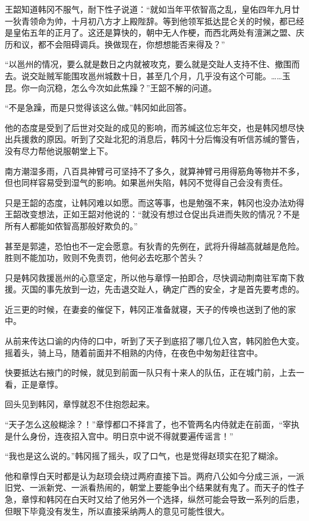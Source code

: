 王韶知道韩冈不服气，耐下性子说道：“就如当年平侬智高之乱，皇佑四年九月廿一狄青领命为帅，十月初八方才上殿陛辞。等到他领军抵达昆仑关的时候，都已经是皇佑五年的正月了。这还是算快的，朝中无人作梗，而西北两处有澶渊之盟、庆历和议，都不会阻碍调兵。换做现在，你想想能否来得及？”

“以邕州的情况，要么就是数日之内就被攻克，要么就是交趾人支持不住、撤围而去。说交趾贼军能围攻邕州城数十日，甚至几个月，几乎没有这个可能。……玉昆。你一向沉稳，怎么今次如此焦躁？”王韶不解的问道。

“不是急躁，而是只觉得该这么做。”韩冈如此回答。

他的态度是受到了后世对交趾的成见的影响，而苏缄这位忘年交，也是韩冈想尽快出兵援救的原因。听到了交趾北犯的消息后，韩冈十分后悔没有听信苏缄的警告，没有尽力帮他说服朝堂上下。

南方潮湿多雨，八百具神臂弓可坚持不了多久，就算神臂弓用得筋角等物并不多，但也同样容易受到湿气的影响。如果邕州失陷，韩冈不觉得自己会没有责任。

只是王韶的态度，让韩冈难以如愿。而这等事，也是勉强不来，韩冈也没办法劝得王韶改变想法，正如王韶对他说的：“就没有想过仓促出兵进而失败的情况？不是所有人都能如侬智高那般好欺负的。”

甚至是郭逵，恐怕也不一定会愿意。有狄青的先例在，武将升得越高就越是危险。胜则不能加功，败则不免责罚，他何必去吃那个苦头？

只是韩冈救援邕州的心意坚定，所以他与章惇一拍即合，尽快调动荆南驻军南下救援。灭国的事先放到一边，先击退交趾人，确定广西的安全，才是首先要考虑的。

近三更的时候，在妻妾的催促下，韩冈正准备就寝，天子的传唤也送到了他的家中。

从前来传达口谕的内侍的口中，听到了天子到底招了哪几位入宫，韩冈脸色大变。摇着头，骑上马，随着前面并不相熟的内侍，在夜色中匆匆赶往宫中。

快要抵达右掖门的时候，就见到前面一队只有十来人的队伍，正在城门前，上去一看，正是章惇。

回头见到韩冈，章惇就忍不住抱怨起来。

“天子怎么这般糊涂？！”章惇都口不择言了，也不管两名内侍就走在前面，“宰执是什么身份，连夜招入宫中。明日京中说不得就要遍传谣言！”

“我也是这么说的。”韩冈摇了摇头，叹了口气，也是觉得赵顼实在犯了糊涂。

他和章惇白天时都是认为赵顼会绕过两府直接下旨。两府八公如今分成三派，一派旧党、一派新党、一派看热闹的，朝堂上要能争出个结果就有鬼了。而天子的性子急，章惇和韩冈在白天时又给了他另外一个选择，纵然可能会导致一系列的后患，但眼下毕竟没有发生，所以直接采纳两人的意见可能性很大。

